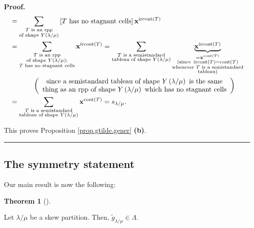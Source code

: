 \documentclass[numbers=enddot,12pt,final,onecolumn,notitlepage]{scrartcl}%
\theoremstyle{definition}
\newtheorem{theo}{Theorem}[section]
\newenvironment{theorem}[1][]
{\begin{theo}[#1]\begin{leftbar}}
{\end{leftbar}\end{theo}}
\newenvironment{proof}[1][Proof]{\noindent\textbf{#1.} }{\ \rule{0.5em}{0.5em}}
\newenvironment{verlong}{}{}
\let\sumnonlimits\sum
\renewcommand{\sum}{\sumnonlimits\limits}
\begin{document}
\begin{proof}
\begin{verlong}
\begin{align*}
&  =\sum_{\substack{T\text{ is an rpp}\\\text{of shape }Y\left(  \lambda
/\mu\right)  }}\left[  T\text{ has no stagnant cells}\right]  \mathbf{x}%
^{\operatorname*{ircont}\left(  T\right)  }\\
&  =\sum_{\substack{T\text{ is an rpp}\\\text{of shape }Y\left(  \lambda
/\mu\right)  ;\\T\text{ has no stagnant cells}}}\mathbf{x}%
^{\operatorname*{ircont}\left(  T\right)  }=\sum_{\substack{T\text{ is a
semistandard}\\\text{tableau of shape }Y\left(  \lambda/\mu\right)
}}\underbrace{\mathbf{x}^{\operatorname*{ircont}\left(  T\right)  }%
}_{\substack{=\mathbf{x}^{\operatorname*{cont}\left(  T\right)  }%
\\\text{(since }\operatorname*{ircont}\left(  T\right)  =\operatorname*{cont}%
\left(  T\right)  \\\text{whenever }T\text{ is a semistandard}%
\\\text{tableau)}}}\\
&  \ \ \ \ \ \ \ \ \ \ \left(
\begin{array}
[c]{c}%
\text{since a semistandard tableau of shape }Y\left(  \lambda/\mu\right)
\text{ is the same}\\
\text{thing as an rpp of shape }Y\left(  \lambda/\mu\right)  \text{ which has
no stagnant cells}%
\end{array}
\right) \\
&  =\sum_{\substack{T\text{ is a semistandard}\\\text{tableau of shape
}Y\left(  \lambda/\mu\right)  }}\mathbf{x}^{\operatorname*{cont}\left(
T\right)  }=s_{\lambda/\mu}.
\end{align*}


This proves Proposition \ref{prop.gtilde.gener} \textbf{(b)}.
\end{verlong}
\end{proof}

\subsection{The symmetry statement}

Our main result is now the following:

\begin{theorem}
\label{thm.gtilde.symm}Let $\lambda/\mu$ be a skew partition. Then,
$\widetilde{g}_{\lambda/\mu}\in\Lambda$.
\end{theorem}
\end{document}
